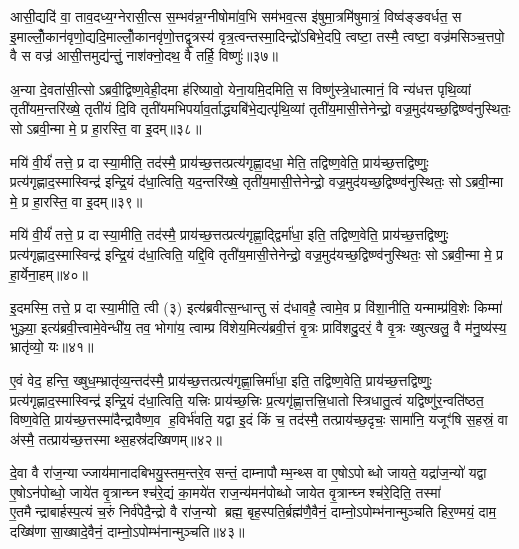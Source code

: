 आसी॒द्यदि॑ वा॒ ताव॒दध्य॒ग्नेरासी॒त्स स॒म्भव॑न्न॒ग्नीषोमा॑व॒भि सम॑भव॒त्स इ॑षुमा॒त्रमि॑षुमात्रं॒ विष्व॑ङ्ङवर्धत॒ स इ॒माल्लोँ॒कान॑वृणो॒द्यदि॒माल्लोँ॒कानवृ॑णो॒त्तद्वृ॒त्रस्य॑ वृत्र॒त्वन्तस्मा॒दिन्द्रो॑ऽबिभे॒दपि॒ त्वष्टा॒ तस्मै॒ त्वष्टा॒ वज्र॑मसिञ्च॒त्तपो॒ वै स वज्र॑ आसी॒त्तमुद्य॑न्तुं॒ नाश॑क्नो॒दथ॒ वै तर्\mbox{}हि॒ विष्णुः॑॥३७॥

अ॒न्या दे॒वता॑सी॒त्सोऽब्रवी॒द्विष्ण॒वेही॒दमा ह॑रिष्यावो॒ येना॒यमि॒दमिति॒ स विष्णु॑स्त्रे॒धात्मानं॒ वि न्य॑धत्त पृथि॒व्यां तृती॑यम॒न्तरि॑ख्षे॒ तृती॑यं दि॒वि तृती॑यमभिपर्याव॒र्ताद्ध्यबि॑भे॒द्यत्पृ॑थि॒व्यां तृती॑य॒मासी॒त्तेनेन्द्रो॒ वज्र॒मुद॑यच्छ॒द्विष्ण्व॑नुस्थितः॒ सोऽब्रवी॒न्मा मे॒ प्र हा॒रस्ति॒ वा इ॒दम्॥३८॥

मयि॑ वी॒र्यं॑ तत्ते॒ प्र दास्या॒मीति॒ तद॑स्मै॒ प्राय॑च्छ॒त्तत्प्रत्य॑गृह्णा॒दधा॒ मेति॒ तद्विष्ण॒वेति॒ प्राय॑च्छ॒त्तद्विष्णुः॒ प्रत्य॑गृह्णाद॒स्मास्विन्द्र॑ इन्द्रि॒यं द॑धा॒त्विति॒ यद॒न्तरि॑ख्षे॒ तृती॑य॒मासी॒त्तेनेन्द्रो॒ वज्र॒मुद॑यच्छ॒द्विष्ण्व॑नुस्थितः॒ सोऽब्रवी॒न्मा मे॒ प्र हा॒रस्ति॒ वा इ॒दम्॥३९॥

मयि॑ वी॒र्यं॑ तत्ते॒ प्र दास्या॒मीति॒ तद॑स्मै॒ प्राय॑च्छ॒त्तत्प्रत्य॑गृह्णा॒द्द्विर्मा॑धा॒ इति॒ तद्विष्ण॒वेति॒ प्राय॑च्छ॒त्तद्विष्णुः॒ प्रत्य॑गृह्णाद॒स्मास्विन्द्र॑ इन्द्रि॒यं द॑धा॒त्विति॒ यद्दि॒वि तृती॑य॒मासी॒त्तेनेन्द्रो॒ वज्र॒मुद॑यच्छ॒द्विष्ण्व॑नुस्थितः॒ सोऽब्रवी॒न्मा मे॒ प्र हा॒र्येना॒हम्॥४०॥

इ॒दमस्मि॒ तत्ते॒ प्र दास्या॒मीति॒ त्वी (३) इत्य॑ब्रवीत्स॒न्धान्तु सं द॑धावहै॒ त्वामे॒व प्र वि॑शा॒नीति॒ यन्माम्प्र॑वि॒शेः किम्मा॑ भुञ्ज्या॒ इत्य॑ब्रवी॒त्त्वामे॒वेन्धी॑य॒ तव॒ भोगा॑य॒ त्वाम्प्र वि॑शेय॒मित्य॑ब्रवी॒त्तं वृ॒त्रः प्रावि॑शदु॒दरं॒ वै वृ॒त्रः ख्षुत्खलु॒ वै म॑नु॒ष्य॑स्य॒ भ्रातृ॑व्यो॒ यः॥४१॥

ए॒वं वेद॒ हन्ति॒ ख्षुध॒म्भ्रातृ॑व्य॒न्तद॑स्मै॒ प्राय॑च्छ॒त्तत्प्रत्य॑गृह्णा॒त्त्रिर्मा॑धा॒ इति॒ तद्विष्ण॒वेति॒ प्राय॑च्छ॒त्तद्विष्णुः॒ प्रत्य॑गृह्णाद॒स्मास्विन्द्र॑ इन्द्रि॒यं द॑धा॒त्विति॒ यत्त्रिः प्राय॑च्छ॒त्त्रिः प्र॒त्यगृ॑ह्णा॒त्तत्त्रि॒धातोस्त्रिधातु॒त्वं यद्विष्णु॑र॒न्वति॑ष्ठत॒ विष्ण॒वेति॒ प्राय॑च्छ॒त्तस्मा॑दैन्द्रावैष्ण॒व ह॒विर्भ॑वति॒ यद्वा इ॒दं किं च॒ तद॑स्मै॒ तत्प्राय॑च्छ॒दृचः॒ सामा॑नि॒ यजूꣳ॑षि स॒हस्रं॒ वा अ॑स्मै॒ तत्प्राय॑च्छ॒त्तस्माथ्स॒हस्र॑दख्षिणम्॥४२॥

{\anuvakamend[{प्र॒व॒णं विष्णु॒र्वा इ॒दमि॒दम॒हं यो भ॑व॒त्येक॑विशतिश्च॥12॥}]}

दे॒वा वै रा॑ज॒न्याज्जाय॑मानादबिभयु॒स्तम॒न्तरे॒व सन्तं॒ दाम्नापौम्भ॒न्थ्स वा ए॒षोऽपोब्धो जायते॒ यद्रा॑ज॒न्यो॑ यद्वा ए॒षोऽन॑पोब्धो॒ जाये॑त वृ॒त्रान्घ्नश्च॑रे॒द्यं का॒मये॑त राज॒न्य॑मन॑पोब्धो जायेत वृ॒त्रान्घ्नश्च॑रे॒दिति॒ तस्मा॑ ए॒तमैन्द्राबार्\mbox{}हस्प॒त्यं च॒रुं निर्व॑पेदै॒न्द्रो वै रा॑ज॒न्यो ब्रह्म॒ बृह॒स्पति॒र्ब्रह्म॑णै॒वैनं॒ दाम्नो॒ऽपोम्भ॑नान्मुञ्चति हिर॒ण्मयं॒ दाम॒ दख्षि॑णा सा॒ख्षादे॒वैनं॒ दाम्नो॒ऽपोम्भ॑नान्मुञ्चति॥४३॥

